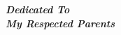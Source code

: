 \begin{center}
\vspace*{6cm}
\Huge
	\textbf{\textit{Dedicated To \\My Respected Parents }}
\end{center}